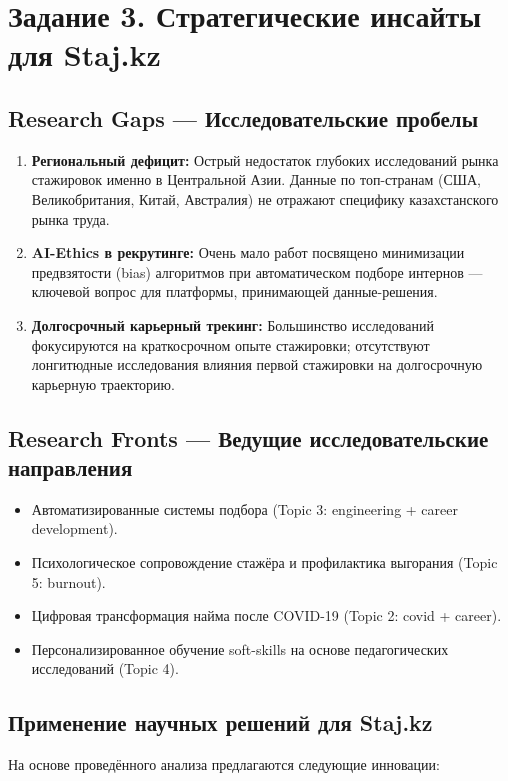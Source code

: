 \documentclass[12pt]{article}
\begin{document}
\section{Задание 3. Стратегические инсайты для Staj.kz}

\subsection{Research Gaps — Исследовательские пробелы}
\begin{enumerate}
    \item \textbf{Региональный дефицит:} Острый недостаток глубоких исследований рынка стажировок именно в Центральной Азии. Данные по топ-странам (США, Великобритания, Китай, Австралия) не отражают специфику казахстанского рынка труда.
    \item \textbf{AI-Ethics в рекрутинге:} Очень мало работ посвящено минимизации предвзятости (bias) алгоритмов при автоматическом подборе интернов — ключевой вопрос для платформы, принимающей данные-решения.
    \item \textbf{Долгосрочный карьерный трекинг:} Большинство исследований фокусируются на краткосрочном опыте стажировки; отсутствуют лонгитюдные исследования влияния первой стажировки на долгосрочную карьерную траекторию.
\end{enumerate}

\subsection{Research Fronts — Ведущие исследовательские направления}
\begin{itemize}
    \item Автоматизированные системы подбора (Topic 3: engineering + career development).
    \item Психологическое сопровождение стажёра и профилактика выгорания (Topic 5: burnout).
    \item Цифровая трансформация найма после COVID-19 (Topic 2: covid + career).
    \item Персонализированное обучение soft-skills на основе педагогических исследований (Topic 4).
\end{itemize}

\subsection{Применение научных решений для Staj.kz}
На основе проведённого анализа предлагаются следующие инновации:
\end{document}
